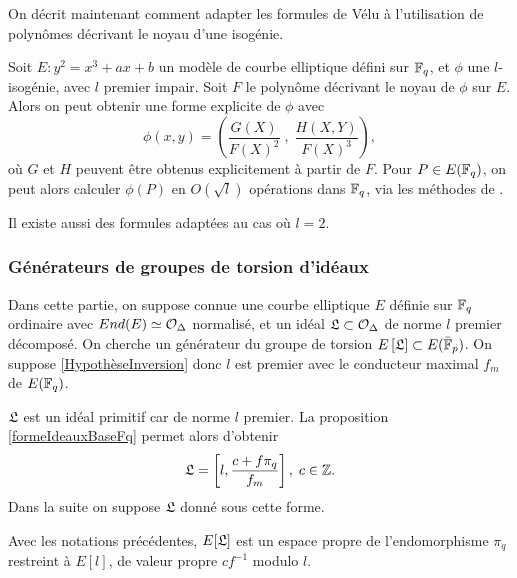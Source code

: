 On décrit maintenant comment adapter les formules de Vélu à l'utilisation de polynômes décrivant le noyau d'une isogénie.

\begin{Prop}
	
	Soit $E : y^2 = x^3 + ax + b$ un modèle de courbe elliptique défini sur $\mathbb{F}_{q}$, et $\phi$ une $l$-isogénie, avec $l$ premier impair. Soit $F$ le polynôme décrivant le noyau de $\phi$ sur $E$. Alors on peut obtenir une forme explicite de $\phi$ avec
	\begin{equation*}
		\phi(x,y) = \left( \frac{G(X)}{F(X)^2}\;,\;\frac{H(X,Y)}{F(X)^3}\right), 
	\end{equation*}
	où $G$ et $H$ peuvent être obtenus explicitement à partir de $F$. Pour $P\in E(\mathbb{F}_{q})$, on peut alors calculer $\phi(P)$ en $O(\sqrt{l})$ opérations dans $\mathbb{F}_{q}$, via les méthodes de \cite{Velusqrt}.
\end{Prop}

\begin{Rem}
	Il existe aussi des formules adaptées au cas où $l = 2$.
\end{Rem}




\subsubsection{Générateurs de groupes de torsion d'idéaux}\label{SECTION generateurTorsion}


Dans cette partie, on suppose connue une courbe elliptique $E$ définie sur $\mathbb{F}_{q}$ ordinaire avec $End(E)\simeq\mathcal{O}_{\Delta}$ normalisé, et un idéal $\mathfrak{L}\subset\mathcal{O}_{\Delta}$ de norme $l$ premier décomposé. On cherche un générateur du groupe de torsion $E\left[ \mathfrak{L}\right]\subset E(\bar{\mathbb{F}}_{p})$. On suppose \ref{HypothèseInversion} donc $l$ est premier avec le conducteur maximal $f_{m}$ de $E(\mathbb{F}_{q})$.

\begin{Rem}
	 $\mathfrak{L}$ est un idéal primitif car de norme $l$ premier. La proposition \ref{formeIdeauxBaseFq} permet alors d'obtenir
	\begin{equation*}
		\mathfrak{L} = \left[ l, \frac{c + f\pi_{q}}{f_{m}}\right], \; c\in\mathbb{Z}.
	\end{equation*}
	Dans la suite on suppose $\mathfrak{L}$ donné sous cette forme. 
\end{Rem}


\begin{Prop}
	Avec les notations précédentes, $E[\mathfrak{L}]$ est un espace propre de l'endomorphisme $\pi_q$ restreint à $E[l]$, de valeur propre $cf^{-1}$ modulo $l$. 
\end{Prop}


